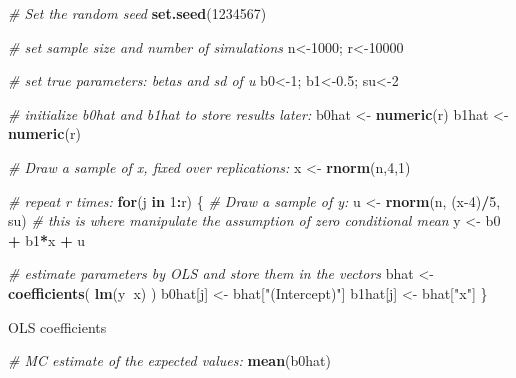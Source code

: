 \documentclass[]{book}
\newenvironment{Shaded}{\begin{snugshade}}{\end{snugshade}}
\newcommand{\CommentTok}[1]{\textcolor[rgb]{0.56,0.35,0.01}{\textit{#1}}}
\newcommand{\ControlFlowTok}[1]{\textcolor[rgb]{0.13,0.29,0.53}{\textbf{#1}}}
\newcommand{\DecValTok}[1]{\textcolor[rgb]{0.00,0.00,0.81}{#1}}
\newcommand{\FloatTok}[1]{\textcolor[rgb]{0.00,0.00,0.81}{#1}}
\newcommand{\KeywordTok}[1]{\textcolor[rgb]{0.13,0.29,0.53}{\textbf{#1}}}
\newcommand{\NormalTok}[1]{#1}
\newcommand{\OperatorTok}[1]{\textcolor[rgb]{0.81,0.36,0.00}{\textbf{#1}}}
\newcommand{\StringTok}[1]{\textcolor[rgb]{0.31,0.60,0.02}{#1}}
\begin{document}
\begin{Shaded}
\begin{Highlighting}[]
\CommentTok{# Set the random seed}
\KeywordTok{set.seed}\NormalTok{(}\DecValTok{1234567}\NormalTok{)}

\CommentTok{# set sample size and number of simulations}
\NormalTok{n<-}\DecValTok{1000}\NormalTok{; r<-}\DecValTok{10000}

\CommentTok{# set true parameters: betas and sd of u}
\NormalTok{b0<-}\DecValTok{1}\NormalTok{; b1<-}\FloatTok{0.5}\NormalTok{; su<-}\DecValTok{2}

\CommentTok{# initialize b0hat and b1hat to store results later:}
\NormalTok{b0hat <-}\StringTok{ }\KeywordTok{numeric}\NormalTok{(r)}
\NormalTok{b1hat <-}\StringTok{ }\KeywordTok{numeric}\NormalTok{(r)}

\CommentTok{# Draw a sample of x, fixed over replications:}
\NormalTok{x <-}\StringTok{ }\KeywordTok{rnorm}\NormalTok{(n,}\DecValTok{4}\NormalTok{,}\DecValTok{1}\NormalTok{)}

\CommentTok{# repeat r times:}
\ControlFlowTok{for}\NormalTok{(j }\ControlFlowTok{in} \DecValTok{1}\OperatorTok{:}\NormalTok{r) \{}
  \CommentTok{# Draw a sample of y:}
\NormalTok{  u <-}\StringTok{ }\KeywordTok{rnorm}\NormalTok{(n, (x}\DecValTok{-4}\NormalTok{)}\OperatorTok{/}\DecValTok{5}\NormalTok{, su) }\CommentTok{# this is where manipulate the assumption of zero conditional mean}
\NormalTok{  y <-}\StringTok{ }\NormalTok{b0 }\OperatorTok{+}\StringTok{ }\NormalTok{b1}\OperatorTok{*}\NormalTok{x }\OperatorTok{+}\StringTok{ }\NormalTok{u}
  
  \CommentTok{# estimate parameters by OLS and store them in the vectors}
\NormalTok{  bhat <-}\StringTok{ }\KeywordTok{coefficients}\NormalTok{( }\KeywordTok{lm}\NormalTok{(y}\OperatorTok{~}\NormalTok{x) )}
\NormalTok{  b0hat[j] <-}\StringTok{ }\NormalTok{bhat[}\StringTok{"(Intercept)"}\NormalTok{]}
\NormalTok{  b1hat[j] <-}\StringTok{ }\NormalTok{bhat[}\StringTok{"x"}\NormalTok{]}
\NormalTok{\}}
\end{Highlighting}
\end{Shaded}

OLS coefficients

\begin{Shaded}
\begin{Highlighting}[]
\CommentTok{# MC estimate of the expected values:}
\KeywordTok{mean}\NormalTok{(b0hat)}
\end{Highlighting}
\end{Shaded}
\end{document}

